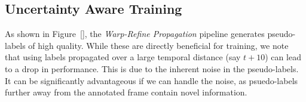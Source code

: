 \subsection{Uncertainty Aware Training}
\label{subsec-alea}

As shown in Figure~\ref{}, the \emph{Warp-Refine Propagation} pipeline generates pseudo-labels of high quality. While these are directly beneficial for training, we note that using labels propagated over a large temporal distance (say $t+10$) can lead to a drop in performance. This is due to the inherent noise in the pseudo-labels. It can be significantly advantageous if we can handle the noise, as psuedo-labels further away from the annotated frame contain novel information. 





